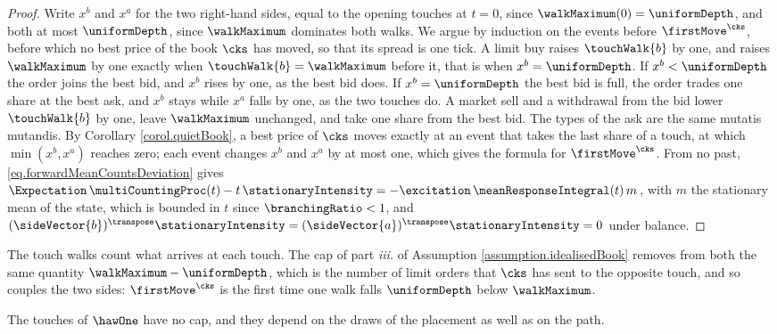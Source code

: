 \begin{proof}
 Write $x^{b}$ and $x^{a}$ for the two right-hand sides,
 equal to the opening touches at $t = 0$, since $\walkMaximum(0) = \uniformDepth$,
 and both at most $\uniformDepth$, since $\walkMaximum$ dominates both walks.
 We argue by induction on the events before $\firstMove^{\cks}$,
 before which no best price of the book $\cks$ has moved,
 so that its spread is one tick.
 A limit buy raises $\touchWalk{b}$ by one,
 and raises $\walkMaximum$ by one exactly when $\touchWalk{b} = \walkMaximum$ before it,
 that is when $x^{b} = \uniformDepth$.
 If $x^{b} < \uniformDepth$ the order joins the best bid,
 and $x^{b}$ rises by one, as the best bid does.
 If $x^{b} = \uniformDepth$ the best bid is full,
 the order trades one share at the best ask,
 and $x^{b}$ stays while $x^{a}$ falls by one, as the two touches do.
 A market sell and a withdrawal from the bid lower $\touchWalk{b}$ by one,
 leave $\walkMaximum$ unchanged,
 and take one share from the best bid.
 The types of the ask are the same mutatis mutandis.
 By Corollary \ref{corol.quietBook},
 a best price of $\cks$ moves exactly at an event that takes the last share of a touch,
 at which $\min(x^{b}, x^{a})$ reaches zero;
 each event changes $x^{b}$ and $x^{a}$ by at most one,
 which gives the formula for $\firstMove^{\cks}$.
 From no past, \eqref{eq.forwardMeanCountsDeviation} gives
 $\Expectation\,\multiCountingProc(t) - t\,\stationaryIntensity
 = -\excitation\,\meanResponseIntegral(t)\,m$,
 with $m$ the stationary mean of the state,
 which is bounded in $t$ since $\branchingRatio < 1$,
 and $(\sideVector{b})^{\transpose}\stationaryIntensity
 = (\sideVector{a})^{\transpose}\stationaryIntensity = 0$ under balance.
\end{proof}

The touch walks count what arrives at each touch.
The cap of part \emph{iii.} of Assumption \ref{assumption.idealisedBook}
removes from both the same quantity $\walkMaximum - \uniformDepth$,
which is the number of limit orders that $\cks$ has sent to the opposite touch,
and so couples the two sides:
$\firstMove^{\cks}$ is the first time one walk falls $\uniformDepth$ below
$\walkMaximum$.

The touches of $\hawOne$ have no cap,
and they depend on the draws of the placement as well as on the path.

